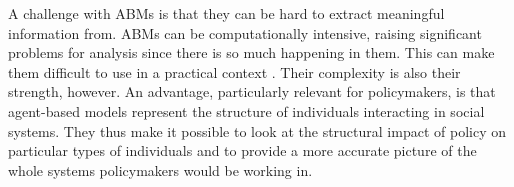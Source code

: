 A challenge with ABMs is that they can be hard to extract meaningful information from. ABMs can be computationally intensive, raising significant problems for analysis since there is so much happening in them. This can make them difficult to use in a practical context \cite{banksStatisticalChallengesAgentBased2021}. %
% 
Their complexity is also their strength, however. An advantage, particularly relevant for policymakers, is that agent-based models represent the structure of individuals interacting in social systems. %
They thus make it possible to look at the structural impact of policy on particular types of individuals and to provide a more accurate picture of the whole systems policymakers would be working in.




%
%
%
%
%
%

